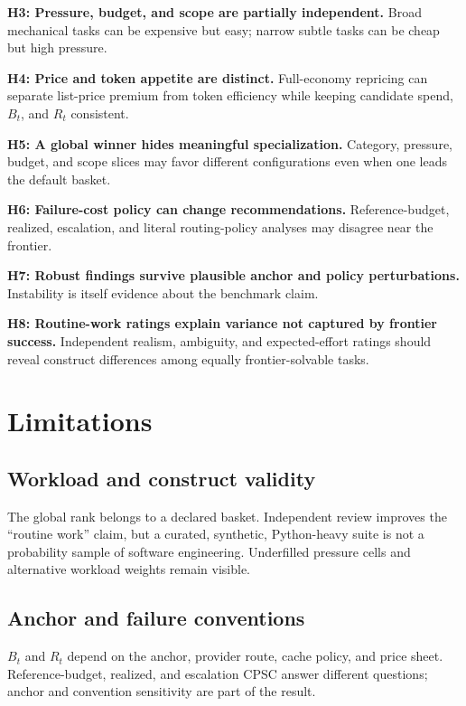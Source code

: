 \documentclass[11pt]{article}
\begin{document}
\textbf{H3: Pressure, budget, and scope are partially independent.} Broad mechanical tasks can be expensive but easy; narrow subtle tasks can be cheap but high pressure.

\textbf{H4: Price and token appetite are distinct.} Full-economy repricing can separate list-price premium from token efficiency while keeping candidate spend, $B_t$, and $R_t$ consistent.

\textbf{H5: A global winner hides meaningful specialization.} Category, pressure, budget, and scope slices may favor different configurations even when one leads the default basket.

\textbf{H6: Failure-cost policy can change recommendations.} Reference-budget, realized, escalation, and literal routing-policy analyses may disagree near the frontier.

\textbf{H7: Robust findings survive plausible anchor and policy perturbations.} Instability is itself evidence about the benchmark claim.

\textbf{H8: Routine-work ratings explain variance not captured by frontier success.} Independent realism, ambiguity, and expected-effort ratings should reveal construct differences among equally frontier-solvable tasks.

\section{Limitations}\hypertarget{13-limitations}{}\label{13-limitations}

\subsection{Workload and construct validity}\hypertarget{131-workload-and-construct-validity}{}\label{131-workload-and-construct-validity}

The global rank belongs to a declared basket. Independent review improves the ``routine work'' claim, but a curated, synthetic, Python-heavy suite is not a probability sample of software engineering. Underfilled pressure cells and alternative workload weights remain visible.

\subsection{Anchor and failure conventions}\hypertarget{132-anchor-and-failure-conventions}{}\label{132-anchor-and-failure-conventions}

$B_t$ and $R_t$ depend on the anchor, provider route, cache policy, and price sheet. Reference-budget, realized, and escalation CPSC answer different questions; anchor and convention sensitivity are part of the result.
\end{document}
